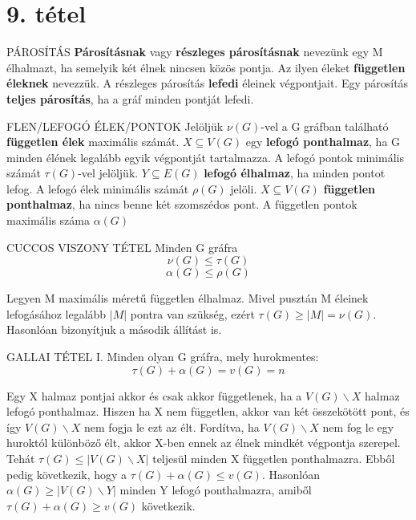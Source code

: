 \section{9. tétel}

\begin{definicio}{PÁROSÍTÁS}
\textbf{Párosításnak} vagy \textbf{részleges párosításnak} nevezünk egy M élhalmazt, ha semelyik két élnek nincsen közös pontja. Az ilyen éleket \textbf{független éleknek} nevezzük. A részleges párosítás \textbf{lefedi} éleinek végpontjait. Egy párosítás \textbf{teljes párosítás}, ha a gráf minden pontját lefedi.
\end{definicio}

\begin{definicio}{FLEN/LEFOGÓ ÉLEK/PONTOK}
Jelöljük $\nu(G)$-vel a G gráfban található \textbf{független élek} maximális számát. $X \subseteq V(G)$ egy \textbf{lefogó ponthalmaz}, ha G minden élének legalább egyik végpontját tartalmazza. A lefogó pontok minimális számát $\tau(G)$-vel jelöljük. $Y \subseteq E(G)$ \textbf{lefogó élhalmaz}, ha minden pontot lefog. A lefogó élek minimális számát $\rho(G)$ jelöli. $X \subseteq V(G)$ \textbf{független ponthalmaz}, ha nincs benne két szomszédos pont. A független pontok maximális száma $\alpha(G)$
\end{definicio}

\begin{tetel}{CUCCOS VISZONY TÉTEL}
Minden G gráfra
$$\nu(G) \leq \tau(G)$$
$$\alpha(G) \leq \rho(G)$$
\end{tetel}

\begin{bizonyitas}{}
Legyen M maximális méretű független élhalmaz. Mivel pusztán M éleinek lefogásához legalább $|M|$ pontra van szükség, ezért $\tau(G) \geq |M| = \nu(G)$.
Hasonlóan bizonyítjuk a második állítást is.
\end{bizonyitas}

\begin{tetel}{GALLAI TÉTEL I.}
Minden olyan G gráfra, mely hurokmentes:
$$\tau(G) + \alpha(G) = v(G) = n$$
\end{tetel}

\begin{bizonyitas}{}
Egy X halmaz pontjai akkor és csak akkor függetlenek, ha a $V(G)\backslash X$ halmaz lefogó ponthalmaz. Hiszen ha X nem független, akkor van két összekötött pont, és így $V(G)\backslash X$ nem fogja le ezt az élt. Fordítva, ha $V(G)\backslash X$ nem fog le egy huroktól különböző élt, akkor X-ben ennek az élnek mindkét végpontja szerepel. Tehát $\tau(G) \leq |V(G)\backslash X|$ teljesül minden X független ponthalmazra. Ebből pedig következik, hogy a $\tau(G) + \alpha(G) \leq v(G)$. Hasonlóan $\alpha(G) \geq |V(G) \backslash Y|$ minden Y lefogó ponthalmazra, amiből $\tau(G) + \alpha(G) \geq v(G)$ következik.
\end{bizonyitas}

